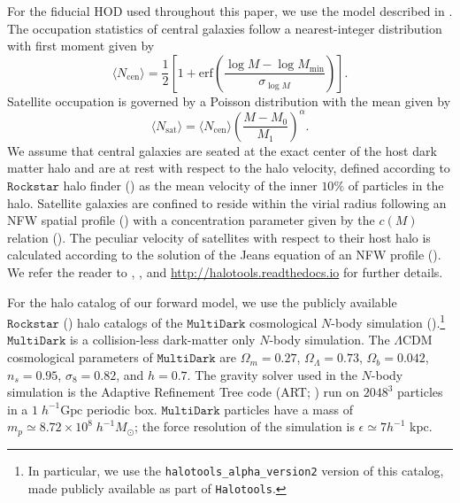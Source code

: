 For the fiducial HOD used throughout this paper, we use the model described in \citealt{zheng07}. 
The occupation statistics of central galaxies follow a nearest-integer distribution with first 
moment given by 
\begin{equation}
\label{eq:ncen}
\langle N_{\mathrm{cen}}\rangle = \frac{1}{2} \left[ 1 + \mathrm{erf}\left(\frac{\log M - \log M_{\mathrm{min}}}{\sigma_{\log M}}\right)\right].
\end{equation}
Satellite occupation is governed by a Poisson distribution with the mean given by 
\begin{equation}
\label{eq:nsat}
\langle N_{\mathrm{sat}}\rangle =  \langle N_{\mathrm{cen}} \rangle \left(\frac{M-M_{0}}{M_1}\right)^{\alpha}.
\end{equation}
We assume that central galaxies are seated at the exact center of the host dark matter halo and 
are at rest with respect to the halo velocity, defined according to $\mathtt{Rockstar}$ halo finder (\cite{rockstar})
as the mean velocity of the inner $10\%$ of particles in the halo. Satellite galaxies are confined to 
reside within the virial radius following an NFW spatial profile (\citealt{nfw}) with a concentration 
parameter given by the $c(M)$ relation (\citealt{nfw_c(M)}). The peculiar velocity of satellites with 
respect to their host halo is calculated according to the solution of the Jeans equation of an NFW 
profile (\citealt{more2010}). We refer the reader to \cite{hearin15}, 
\cite{Hearin:2016aa}, and \url{http://halotools.readthedocs.io}
for further details.  

For the halo catalog of our forward model, we use the publicly available $\mathtt{Rockstar}$ 
(\citealt{rockstar}) halo catalogs of the $\mathtt{MultiDark}$ cosmological $N$-body simulation 
(\citealt{multidark}).\footnote{In particular, we use the {\tt halotools\_alpha\_version2} version of this catalog, made publicly available as part of {\tt Halotools}.} $\mathtt{MultiDark}$ is a collision-less dark-matter only $N$-body simulation. 
The $\Lambda$CDM cosmological parameters of $\mathtt{MultiDark}$ are $\Omega_m = 0.27$, $\Omega_{\Lambda}=0.73$,
$\Omega_{b}=0.042$, $n_{s}=0.95$, $\sigma_{8} = 0.82$, and $h = 0.7$. The gravity solver used in the 
$N$-body simulation is the Adaptive Refinement Tree code (ART; \citealt{art}) run on $2048^3$ particles in a
$1\; h^{-1}\mathrm{Gpc}$ periodic box. $\mathtt{MultiDark}$ particles have a mass of $m_{p} \simeq 8.72 \times 
10^{8} \; h^{-1}M_{\odot}$; the force resolution of the simulation is $\epsilon \simeq 7 h^{-1}$ kpc.

